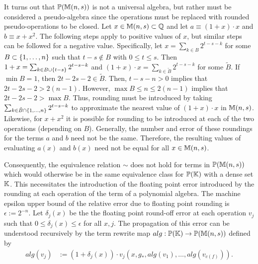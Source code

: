 \documentclass[]{elsarticle}
\begin{document}
It turns out that $\mathbb{P}(\mathbb{M}(n,s))$ is not a universal algebra, but rather must be considered a pseudo-algebra since the operations must be replaced with rounded pseudo-operations to be closed.
Let $x\in \mathbb{M}(n,s)\subset\mathbb{Q}$ and let $a\equiv (1+x)\cdot x$ and $b\equiv x+x^2$.
The following steps apply to positive values of $x$, but similar steps can be followed for a negative value.
Specifically, let $x = \sum_{k\in B} 2^{t-s-k}$ for some $B\subset\left\{ 1,\dots,n \right\}$ such that $t-s\notin B$ with $0\leq t\leq s$.
Then $1+x = \sum_{k\in B\cup\left\{ t-s \right\}}2^{t-s-k}$ and $(1+x)\cdot x = \sum_{k\in\tilde B} 2^{t-s-k}$ for some $\tilde B$. If $\min B=1$, then $2t-2s-2\in\tilde B$. Then, $t-s-n>0$ implies that $2t-2s-2>2(n-1)$.
However, $\max B\leq n\leq2(n-1)$ implies that $2t-2s-2>\max B$.
Thus, rounding must be introduced by taking $\sum_{k\in\tilde B\cap\left\{ 1,\dots,n \right\}}2^{t-s-k}$ to approximate the nearest value of $(1+x)\cdot x$ in $\mathbb{M}(n,s)$.
Likewise, for $x+x^2$ it is possible for rounding to be introduced at each of the two operations (depending on $B$). Generally, the number and error of these roundings for the terms $a$ and $b$ need not be the same.
Therefore, the resulting values of evaluating $a(x)$ and $b(x)$ need not be equal for all $x\in\mathbb{M}(n,s)$.
	
Consequently, the equivalence relation $\sim$ does not hold for terms in $\mathbb{P}(\mathbb{M}(n,s))$ which would otherwise be in the same equivalence class for $\mathbb{P}(\mathbb{K})$ with a dense set $\mathbb{K}$.
This necessitates the introduction of the floating point error introduced by the rounding at each operation of the term of a polynomial algebra.
The machine epsilon upper bound of the relative error due to floating point rounding is $\epsilon:=2^{-n}$.
Let $\delta_j(x)$ be the the floating point round-off error at each operation $v_j$ such that $0\leq\delta_j(x)\leq\epsilon$ for all $x,j$.
The propagation of this error can be understood recursively by the term rewrite map $alg:\mathbb{P}(\mathbb{K})\rightarrow\mathbb{P}(\mathbb{M}(n,s))$ defined by
\begin{align*}
	alg(v_j) &:=
	(1+\delta_j(x))\cdot v_j(x,g_*,alg(v_1),\dots,alg(v_{c(f)})).
\end{align*}
\end{document}

